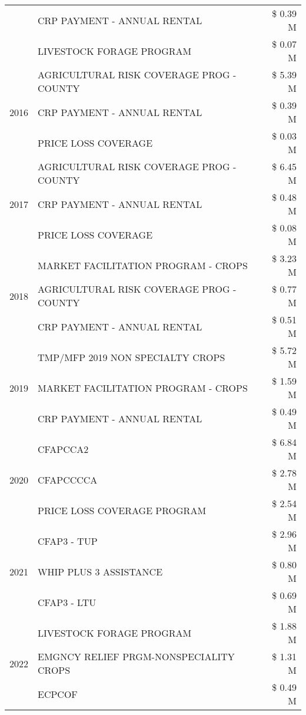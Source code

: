 \begin{tabular}{llr}
 & CRP PAYMENT - ANNUAL RENTAL & \$ 0.39 M \\
 & LIVESTOCK FORAGE PROGRAM & \$ 0.07 M \\
\cline{1-3}
\multirow[t]{3}{*}{2016} & AGRICULTURAL RISK COVERAGE PROG - COUNTY & \$ 5.39 M \\
 & CRP PAYMENT - ANNUAL RENTAL & \$ 0.39 M \\
 & PRICE LOSS COVERAGE & \$ 0.03 M \\
\cline{1-3}
\multirow[t]{3}{*}{2017} & AGRICULTURAL RISK COVERAGE PROG - COUNTY & \$ 6.45 M \\
 & CRP PAYMENT - ANNUAL RENTAL & \$ 0.48 M \\
 & PRICE LOSS COVERAGE & \$ 0.08 M \\
\cline{1-3}
\multirow[t]{3}{*}{2018} & MARKET FACILITATION PROGRAM - CROPS & \$ 3.23 M \\
 & AGRICULTURAL RISK COVERAGE PROG - COUNTY & \$ 0.77 M \\
 & CRP PAYMENT - ANNUAL RENTAL & \$ 0.51 M \\
\cline{1-3}
\multirow[t]{3}{*}{2019} & TMP/MFP 2019 NON SPECIALTY CROPS & \$ 5.72 M \\
 & MARKET FACILITATION PROGRAM - CROPS & \$ 1.59 M \\
 & CRP PAYMENT - ANNUAL RENTAL & \$ 0.49 M \\
\cline{1-3}
\multirow[t]{3}{*}{2020} & CFAPCCA2 & \$ 6.84 M \\
 & CFAPCCCCA & \$ 2.78 M \\
 & PRICE LOSS COVERAGE PROGRAM & \$ 2.54 M \\
\cline{1-3}
\multirow[t]{3}{*}{2021} & CFAP3 - TUP & \$ 2.96 M \\
 & WHIP PLUS 3 ASSISTANCE & \$ 0.80 M \\
 & CFAP3 - LTU & \$ 0.69 M \\
\cline{1-3}
\multirow[t]{3}{*}{2022} & LIVESTOCK FORAGE PROGRAM & \$ 1.88 M \\
 & EMGNCY RELIEF PRGM-NONSPECIALITY CROPS & \$ 1.31 M \\
 & ECPCOF & \$ 0.49 M \\
\cline{1-3}
\bottomrule
\end{tabular}
